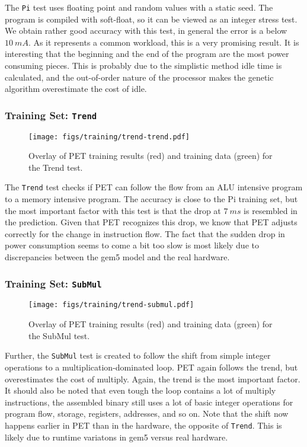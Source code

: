 The \texttt{Pi} test uses floating point and random values with a static seed. The
program is compiled with soft-float, so it can be viewed as an integer stress
test. We obtain rather good accuracy with this test, in general the error is a
below $10~mA$. As it represents a common workload, this is a very promising
result. It is interesting that the beginning and the end of the program are the
most power consuming pieces. This is probably due to the simplistic method idle
time is calculated, and the out-of-order nature of the processor makes the
genetic algorithm overestimate the cost of idle.

\subsubsection{Training Set: \texttt{Trend}}
\begin{figure}[htb]
    \centering
    \texttt{[image: figs/training/trend-trend.pdf]}
    \caption{Overlay of PET training results (red) and training data (green) for the Trend test.}
    \label{fig:trend-training}
\end{figure}

The \texttt{Trend} test checks if PET can follow the flow from an ALU intensive
program to a memory intensive program. The accuracy is close to the Pi training
set, but the most important factor with this test is that the drop at $7~ms$ is
resembled in the prediction. Given that PET recognizes this drop, we know that
PET adjusts correctly for the change in instruction flow. The fact that the
sudden drop in power consumption seems to come a bit too slow is most likely due
to discrepancies between the gem5 model and the real hardware.

\newpage

\subsubsection{Training Set: \texttt{SubMul}}
\begin{figure}[htb]
    \centering
    \texttt{[image: figs/training/trend-submul.pdf]}
    \caption{Overlay of PET training results (red) and training data (green) for the SubMul test.}
    \label{fig:submul-training}
\end{figure}

Further, the \texttt{SubMul} test is created to follow the shift from simple
integer operations to a multiplication-dominated loop. PET again follows the
trend, but overestimates the cost of multiply. Again, the trend is the most
important factor. It should also be noted that even tough the loop contains a
lot of multiply instructions, the assembled binary still uses a lot of basic
integer operations for program flow, storage, registers, addresses, and so on.
Note that the shift now happens earlier in PET than in the hardware, the
opposite of \texttt{Trend}. This is likely due to runtime variatons in gem5
versus real hardware.

